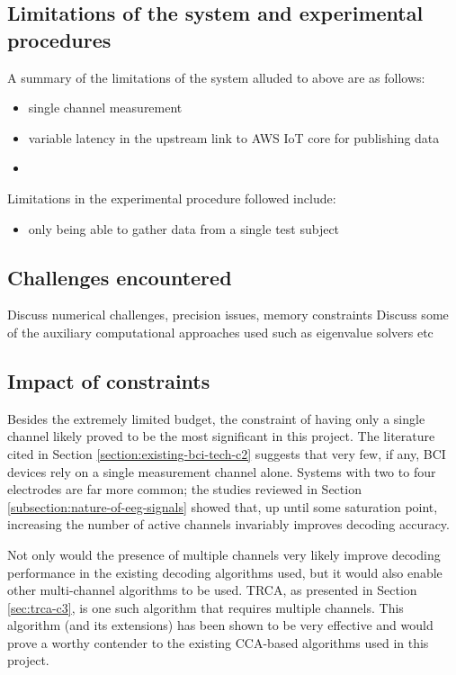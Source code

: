 \subsection{Limitations of the system and experimental procedures}
A summary of the limitations of the system alluded to above are as follows:
\begin{itemize}
    \item single channel measurement
    \item variable latency in the upstream link to AWS IoT core for publishing data
    \item 
\end{itemize}

Limitations in the experimental procedure followed include:
\begin{itemize}
    \item only being able to gather data from a single test subject
\end{itemize}


\subsection{Challenges encountered}
Discuss numerical challenges, precision issues, memory constraints
Discuss some of the auxiliary computational approaches used such as eigenvalue solvers etc


\subsection{Impact of constraints}
Besides the extremely limited budget, the constraint of having only a single channel likely proved to be the most significant in this project. The literature cited in Section \ref{section:existing-bci-tech-c2} suggests that very few, if any, BCI devices rely on a single measurement channel alone. Systems with two to four electrodes are far more common; the studies reviewed in Section \ref{subsection:nature-of-eeg-signals} showed that, up until some saturation point, increasing the number of active channels invariably improves decoding accuracy. 

Not only would the presence of multiple channels very likely improve decoding performance in the existing decoding algorithms used, but it would also enable other multi-channel algorithms to be used. TRCA, as presented in Section \ref{sec:trca-c3}, is one such algorithm that requires multiple channels. This algorithm (and its extensions) has been shown to be very effective and would prove a worthy contender to the existing CCA-based algorithms used in this project. 

